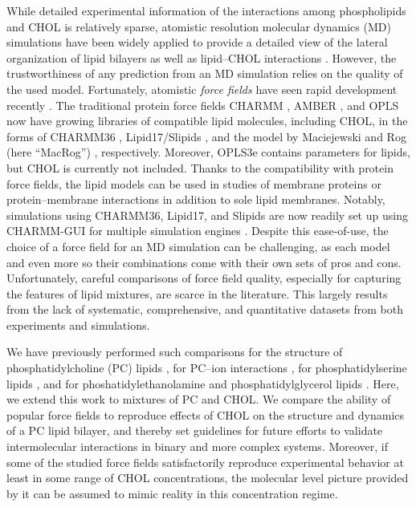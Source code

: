 \documentclass[aps,prl,superscriptaddress]{revtex4-2}
\begin{document}
While detailed experimental information of the interactions among phospholipids and CHOL is relatively sparse, atomistic resolution molecular dynamics (MD) simulations have been widely applied to provide a detailed view of the lateral organization of lipid bilayers as well as lipid--CHOL interactions \cite{rog14,rog2009ordering,berkowitz2009detailed}. However, the trustworthiness of any prediction from an MD simulation relies on the quality of the used model. Fortunately, atomistic \emph{force fields} have seen rapid development recently \cite{leonard2019developing}. The traditional protein force fields CHARMM \cite{brooks1983charmm}, AMBER \cite{cornell1995second}, and OPLS \cite{jorgensen1988opls,harder2016opls3} now have growing libraries of compatible lipid molecules, including CHOL, in the forms of CHARMM36 \cite{Klauda06,lim12}, Lipid17/Slipids \cite{dickson14,madej15,jambeck12,jambeck12b,jambeck13b,grote2020optimization}, and the model by Maciejewski and Rog (here ``MacRog'') \cite{maciejewski14,kulig14,kulig15,Kulig15b}, respectively. Moreover, OPLS3e \cite{harder2016opls3} contains parameters for lipids, but CHOL is currently not included. Thanks to the compatibility with protein force fields, the lipid models can be used in studies of membrane proteins or protein--membrane interactions in addition to sole lipid membranes. Notably, simulations using CHARMM36, Lipid17, and Slipids are now readily set up using CHARMM-GUI for multiple simulation engines \cite{lee16,lee2020charmm}. Despite this ease-of-use, the choice of a force field for an MD simulation can be challenging, as each model and even more so their combinations come with their own sets of pros and cons. Unfortunately, careful comparisons of force field quality, especially for capturing the features of lipid mixtures, are scarce in the literature. This largely results from the lack of systematic, comprehensive, and quantitative datasets from both experiments and simulations.

We have previously performed such comparisons for the structure of phosphatidylcholine (PC) lipids \cite{botan15}, for PC--ion interactions \cite{catte2016molecular}, for phosphatidylserine lipids \cite{antila2019headgroup}, and for phoshatidylethanolamine and phosphatidylglycerol lipids \cite{bacle2021inverse}. Here, we extend this work to mixtures of PC and CHOL. We compare the ability of popular force fields to reproduce effects of CHOL on the structure and dynamics of a PC lipid bilayer, and thereby set guidelines for future efforts to validate intermolecular interactions in binary and more complex systems. Moreover, if some of the studied force fields satisfactorily reproduce experimental behavior at least in some range of CHOL concentrations, the molecular level picture provided by it can be assumed to mimic reality in this concentration regime. 
\end{document}
